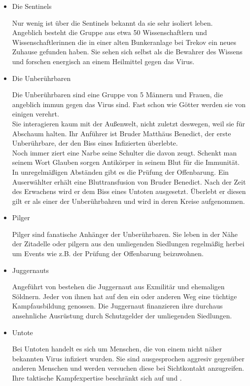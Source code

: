 \begin{itemize}
  \item Die Sentinels

Nur wenig ist über die Sentinels bekannt da sie sehr isoliert leben.\\Angeblich besteht die Gruppe aus etwa 50 Wissenschaftlern und Wissenschaftlerinnen die in einer alten Bunkeranlage bei Trekov ein neues Zuhause gefunden haben. Sie sehen sich selbst als die Bewahrer des Wissens und forschen energisch an einem Heilmittel gegen das Virus.

  \item Die Unberührbaren

Die Unberührbaren sind eine Gruppe von 5 Männern und Frauen, die angeblich immun gegen das Virus sind. Fast schon wie Götter werden sie von einigen verehrt.
\\Sie interagieren kaum mit der Außenwelt, nicht zuletzt deswegen, weil sie  für Abschaum halten. Ihr Anführer ist Bruder Matthäus Benedict, der erste Unberührbare, der den Biss eines Infizierten überlebte.
\\Noch immer ziert eine Narbe seine Schulter die davon zeugt. Schenkt man seinem Wort Glauben sorgen Antikörper in seinem Blut für die Immunität.
\\In unregelmäßigen Abständen gibt es die Prüfung der Offenbarung. Ein Auserwählter erhält eine Bluttransfusion von Bruder Benedict. Nach der Zeit des Erwachens wird er dem Biss eines Untoten ausgesetzt. Überlebt er diesen gilt er als einer der Unberührbahren und wird in deren Kreise aufgenommen.

  \item Pilger

Pilger sind fanatische Anhänger der Unberührbaren. Sie leben in der Nähe der Zitadelle oder pilgern aus den umliegenden Siedlungen regelmäßig herbei um Events wie z.B. der Prüfung der Offenbarung beizuwohnen.

  \item Juggernauts

Angeführt von  bestehen die Juggernaut aus Exmilitär und ehemaligen Söldnern. Jeder von ihnen hat auf den ein oder anderen Weg eine tüchtige Kampfausbildung genossen. Die Juggernaut finanzieren ihre durchaus ansehnliche Ausrüstung durch Schutzgelder der umliegenden Siedlungen.

  \item Untote

Bei Untoten handelt es sich um Menschen, die von einem nicht näher bekannten Virus infiziert wurden. Sie sind ausgesprochen aggresiv gegenüber anderen Menschen und werden versuchen diese bei Sichtkontakt anzugreifen. Ihre taktische Kampfexpertise beschränkt sich auf  und .


\end{itemize}
